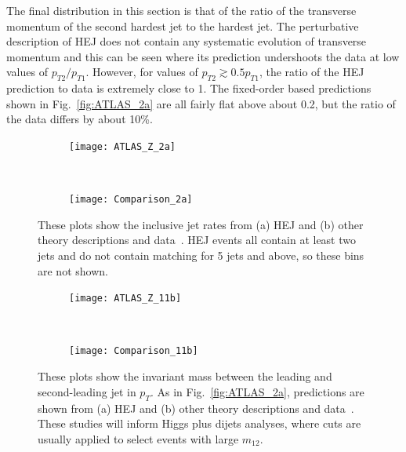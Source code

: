 			The final distribution in this section is that of the ratio of the transverse
			momentum of the second hardest jet to the hardest jet.  The perturbative
			description of HEJ does not contain any systematic evolution of transverse
			momentum and this can be seen where its prediction undershoots the data at low
			values of $p_{T2}/p_{T1}$.  However, for values of $p_{T2} \gtrsim 0.5 p_{T1}$,
			the ratio of the HEJ prediction to data is extremely close to 1.  The
			fixed-order based predictions shown in Fig.~\eqref{fig:ATLAS_2a} are all fairly
			flat above about 0.2, but the ratio of the data differs by about 10\%.

			\newpage

			\begin{figure}[H]
			  \centering
			  \begin{subfigure}[b]{0.48\textwidth}
			    \texttt{[image: ATLAS\_Z\_2a]}
			    \label{fig:HEJ_ATLAS_2a}
			  \end{subfigure}
			  ~
			  \begin{subfigure}[b]{0.48\textwidth}
			    \texttt{[image: Comparison\_2a]}
			    \caption{}
			    \label{fig:MC_ATLAS_2a}
			  \end{subfigure}
			  \caption{These plots show the inclusive jet rates from (a) HEJ and (b) other
			    theory descriptions and data~\cite{Aad:2013ysa}.  HEJ events all contain at
			    least two jets and do not contain matching for 5 jets and above, so these
			    bins are not shown.}
			  \label{fig:ATLAS_2a}

			  \begin{subfigure}[b]{0.48\textwidth}
			    \texttt{[image: ATLAS\_Z\_11b]}
			    \caption{}
			    \label{fig:HEJ_ATLAS_11b}
			  \end{subfigure}
			  ~
			  \begin{subfigure}[b]{0.48\textwidth}
			    \texttt{[image: Comparison\_11b]}
			    \caption{}
			    \label{fig:MC_ATLAS_11b}
			  \end{subfigure}
			  \caption{These plots show the invariant mass between the leading and
			    second-leading jet in $p_T$.  As in Fig.~\eqref{fig:ATLAS_2a}, predictions are
			    shown from (a) HEJ and (b) other theory descriptions and
			    data~\cite{Aad:2013ysa}. These studies will inform Higgs plus dijets
			    analyses, where cuts are usually applied to select events with large
			    $m_{12}$.}
			  \label{fig:ATLAS_11b}
			\end{figure}

